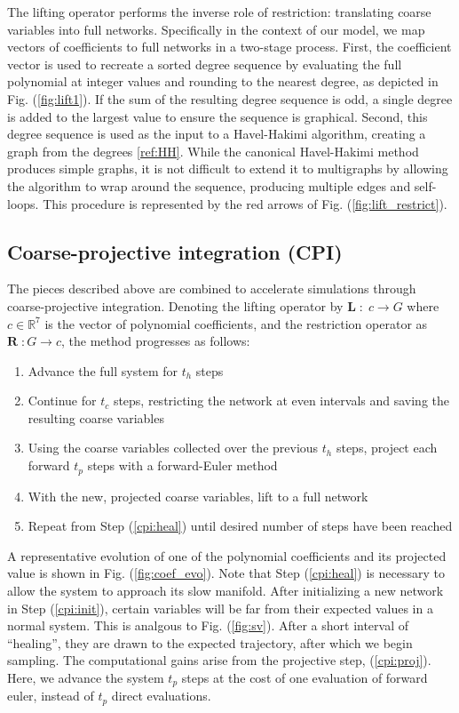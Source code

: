 \documentclass[12pt]{article}
\begin{document}
\begin{onehalfspace}
The lifting operator performs the inverse role of restriction: translating coarse variables into full networks. Specifically in the context of our model, we map vectors of coefficients to full networks in a two-stage process. First, the coefficient vector is used to recreate a sorted degree sequence by evaluating the full polynomial at integer values and rounding to the nearest degree, as depicted in Fig. (\ref{fig:lift1}). If the sum of the resulting degree sequence is odd, a single degree is added to the largest value to ensure the sequence is graphical. Second, this degree sequence is used as the input to a Havel-Hakimi algorithm, creating a graph from the degrees \ref{ref:HH}. While the canonical Havel-Hakimi method produces simple graphs, it is not difficult to extend it to multigraphs by allowing the algorithm to wrap around the sequence, producing multiple edges and self-loops. This procedure is represented by the red arrows of Fig. (\ref{fig:lift_restrict}).

\subsection{Coarse-projective integration (CPI)}
\label{sec:cpi}

The pieces described above are combined to accelerate simulations through coarse-projective integration. Denoting the lifting operator by $\mathbf{L} \; : \; c \rightarrow G$ where $c \in \mathbb{R}^7$ is the vector of polynomial coefficients, and the restriction operator as $\mathbf{R} \; : G \rightarrow c$, the method progresses as follows:

\begin{enumerate}
\item Advance the full system for $t_h$ steps
\label{cpi:heal}
\item Continue for $t_c$ steps, restricting the network at even intervals and saving the resulting coarse variables
\item Using the coarse variables collected over the previous $t_h$ steps, project each forward $t_p$ steps with a forward-Euler method
\label{cpi:proj}
\item With the new, projected coarse variables, lift to a full network
\label{cpi:init}
\item Repeat from Step (\ref{cpi:heal}) until desired number of steps have been reached
\end{enumerate}

A representative evolution of one of the polynomial coefficients and its projected value is shown in Fig. (\ref{fig:coef_evo}). Note that Step (\ref{cpi:heal}) is necessary to allow the system to approach its slow manifold. After initializing a new network in Step (\ref{cpi:init}), certain variables will be far from their expected values in a normal system. This is analgous to Fig. (\ref{fig:sv}). After a short interval of ``healing'', they are drawn to the expected trajectory, after which we begin sampling. The computational gains arise from the projective step, (\ref{cpi:proj}). Here, we advance the system $t_p$ steps at the cost of one evaluation of forward euler, instead of $t_p$ direct evaluations. \\


\end{onehalfspace}
\end{document}
